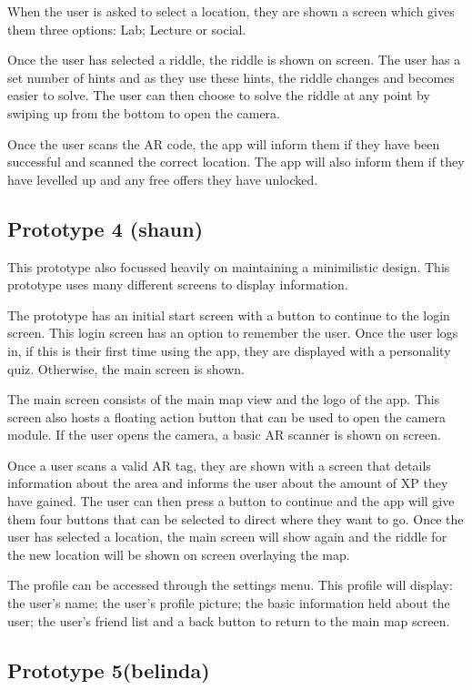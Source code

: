 \documentclass[10pt,twocolumn]{article} %
\begin{document}
When the user is asked to select a location, they are shown a screen which gives them three options: Lab; Lecture or social.

Once the user has selected a riddle, the riddle is shown on screen. The user has a set number of hints and as they use these hints, the riddle changes and becomes easier to solve. The user can then choose to solve the riddle at any point by swiping up from the bottom to open the camera. 

Once the user scans the AR code, the app will inform them if they have been successful and scanned the correct location. The app will also inform them if they have levelled up and any free offers they have unlocked.

\subsection*{Prototype 4 (shaun)}
This prototype also focussed heavily on maintaining a minimilistic design. This prototype uses many different screens to display information. 

The prototype has an initial start screen with a button to continue to the login screen. This login screen has an option to remember the user. Once the user logs in, if this is their first time using the app, they are displayed with a personality quiz. Otherwise, the main screen is shown.

The main screen consists of the main map view and the logo of the app. This screen also hosts a floating action button that can be used to open the camera module. If the user opens the camera, a basic AR scanner is shown on screen. 

Once a user scans a valid AR tag, they are shown with a screen that details information about the area and informs the user about the amount of XP they have gained. The user can then press a button to continue and the app will give them four buttons that can be selected to direct where they want to go. Once the user has selected a location, the main screen will show again and the riddle for the new location will be shown on screen overlaying the map.

The profile can be accessed through the settings menu. This profile will display: the user's name; the user's profile picture; the basic information held about the user; the user's friend list and a back button to return to the main map screen.

\subsection*{Prototype 5(belinda)}
\end{document}
